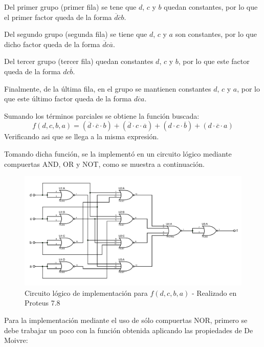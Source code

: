 \begin{centering}
    \begin{Karnaugh}
    \end{Karnaugh}
\par\end{centering}

Del primer grupo (primer fila) se tene que $d$, $c$ y $b$ quedan 
constantes, por lo que el primer factor queda de la forma 
$ \overline{d} \overline{c} b$.\par
Del segundo grupo (segunda fila) se tiene que $d$, $c$ y $a$ son 
constantes, por lo que dicho factor queda de la forma $ \overline{d} c \overline{a}$.\par
Del tercer grupo (tercer fila) quedan constantes $d$, $c$ y $b$, por lo 
que este factor queda de la forma $d c \overline{b}$.\par
Finalmente, de la última fila, en el grupo se mantienen constantes
$d$, $c$ y $a$, por lo que este último factor queda de la forma 
$d \overline{c} a$.\par
Sumando los términos parciales se obtiene la función buscada:
\[
    \boxed{f(d,c,b,a)=(\overline{d} \cdot \overline{c} \cdot b)+
    (\overline{d} \cdot c \cdot \overline{a})+
    (d \cdot c \cdot \overline{b})+  
    (d \cdot \overline{c} \cdot a)}     
\]
Verificando asi que se llega a la misma expresión.\par
Tomando dicha función, se la implementó en un circuito lógico mediante 
compuertas AND, OR y NOT, como se muestra a continuación.

\begin{figure}[H]
    \begin{centering}
    \includegraphics[width=\textwidth]{ImplementacionEj2_NOR}
    \par\end{centering}
    \caption{Circuito lógico de implementación para $f(d,c,b,a)$ - Realizado en Proteus 7.8}
\end{figure}

Para la implementación mediante el uso de sólo compuertas NOR, primero 
se debe trabajar un poco con la función obtenida aplicando las propiedades 
de De Moivre:



